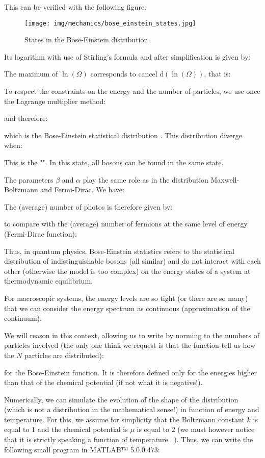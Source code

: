 	This can be verified with the following figure:
	\begin{figure}[H]
		\centering
		\texttt{[image: img/mechanics/bose\_einstein\_states.jpg]}
		\caption{States in the Bose-Einstein distribution}
	\end{figure}
	Its logarithm with use of Stirling's formula and after simplification is given by:
	
	The maximum of $\ln(\Omega)$ corresponds to cancel $\mathrm{d}(\ln(\Omega))$, that is:
	
	To respect the constraints on the energy and the number of particles, we use once the Lagrange multiplier method:
	
	and therefore:
	
	which is the Bose-Einstein statistical distribution . This distribution diverge when:
	
	This is the "". In this state, all bosons can be found in the same state.
	
	The parameters $\beta$ and $\alpha$ play the same role as in the distribution Maxwell-Boltzmann and Fermi-Dirac. We have:
	
	The (average) number of photos is therefore given by:
	
	to compare with the (average) number of fermions at the same level of energy (Fermi-Dirac function):
	
	Thus, in quantum physics, Bose-Einstein statistics refers to the statistical distribution of indistinguishable bosons (all similar) and do not interact with each other (otherwise the model is too complex) on the energy states of a system at thermodynamic equilibrium.

	For macroscopic systems, the energy levels are so tight (or there are so many) that we can consider the energy spectrum as continuous (approximation of the continuum).

	We will reason in this context, allowing us to write by norming to the numbers of particles involved (the only one think we request is that the function tell us how the $N$ particles are distributed):
	
	for the Bose-Einstein function. It is therefore defined only for the energies higher than that of the chemical potential (if not what it is negative!).
	
	Numerically, we can simulate the evolution of the shape of the distribution (which is not a distribution in the mathematical sense!) in function of energy and temperature. For this, we assume for simplicity that the Boltzmann constant $k$ is equal to $1$ and the chemical potential is $\mu$ is equal to $2$ (we must however notice that it is strictly speaking a function of temperature...). Thus, we can write the following small program in MATLAB™ 5.0.0.473:

